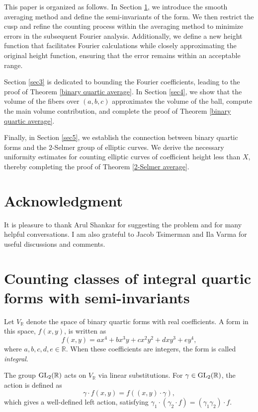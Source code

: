 \documentclass{article}
\def\GL{{\rm GL}}
\def\R{{\mathbb R}}
\begin{document}
This paper is organized as follows. In Section \ref{sec2}, we introduce the smooth averaging method and define the semi-invariants of the form. We then restrict the cusp and refine the counting process within the averaging method to minimize errors in the subsequent Fourier analysis. Additionally, we define a new height function that facilitates Fourier calculations while closely approximating the original height function, ensuring that the error remains within an acceptable range.

Section \ref{sec3} is dedicated to bounding the Fourier coefficients, leading to the proof of Theorem \ref{binary quartic average}. In Section \ref{sec4}, we show that the volume of the fibers over $(a,b,c)$ approximates the volume of the ball, compute the main volume contribution, and complete the proof of Theorem \ref{binary quartic average}.

Finally, in Section \ref{sec5}, we establish the connection between binary quartic forms and the $2$-Selmer group of elliptic curves. We derive the necessary uniformity estimates for counting elliptic curves of coefficient height less than $X$, thereby completing the proof of Theorem \ref{2-Selmer average}.

\section*{Acknowledgment } 
It is pleasure to thank Arul Shankar for suggesting the problem and for many helpful conversations. I am also grateful to Jacob Tsimerman and Ila Varma for useful discussions and comments.

\section{Counting classes of integral quartic forms with semi-invariants}\label{sec2}

Let $V_{\R}$ denote the space of binary quartic forms with real coefficients. A form in this space, $f(x,y)$, is written as
\begin{equation*}
f(x,y) = ax^4 + bx^3y + cx^2y^2 + dxy^3 + ey^4,
\end{equation*}
where $a, b, c, d, e \in \R$. When these coefficients are integers, the form is called \textit{integral}.

The group $\GL_2(\R)$ acts on $V_{\R}$ via linear substitutions. For $\gamma \in \GL_2(\R)$, the action is defined as
\begin{equation*}
\gamma \cdot f(x,y) = f((x,y) \cdot \gamma),
\end{equation*}
which gives a well-defined left action, satisfying $\gamma_1 \cdot (\gamma_2 \cdot f) = (\gamma_1 \gamma_2) \cdot f$.
\end{document}
